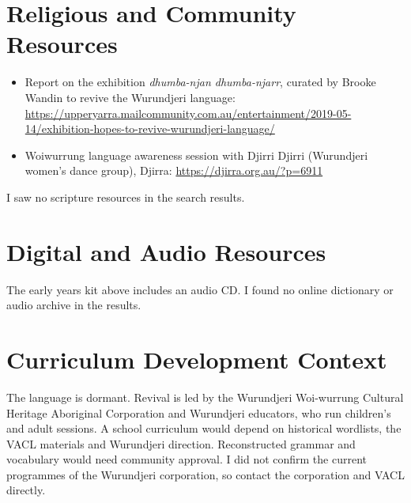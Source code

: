 \documentclass[12pt]{article}
\begin{document}
\section{Religious and Community Resources}
\begin{itemize}
\item Report on the exhibition \emph{dhumba-njan dhumba-njarr}, curated by Brooke Wandin to revive the Wurundjeri language: \url{https://upperyarra.mailcommunity.com.au/entertainment/2019-05-14/exhibition-hopes-to-revive-wurundjeri-language/}
\item Woiwurrung language awareness session with Djirri Djirri (Wurundjeri women's dance group), Djirra: \url{https://djirra.org.au/?p=6911}
\end{itemize}
I saw no scripture resources in the search results.

\section{Digital and Audio Resources}
The early years kit above includes an audio CD. I found no online dictionary or audio archive in the results.

\section{Curriculum Development Context}
The language is dormant. Revival is led by the Wurundjeri Woi-wurrung Cultural Heritage Aboriginal Corporation and Wurundjeri educators, who run children's and adult sessions. A school curriculum would depend on historical wordlists, the VACL materials and Wurundjeri direction. Reconstructed grammar and vocabulary would need community approval. I did not confirm the current programmes of the Wurundjeri corporation, so contact the corporation and VACL directly.
\end{document}
